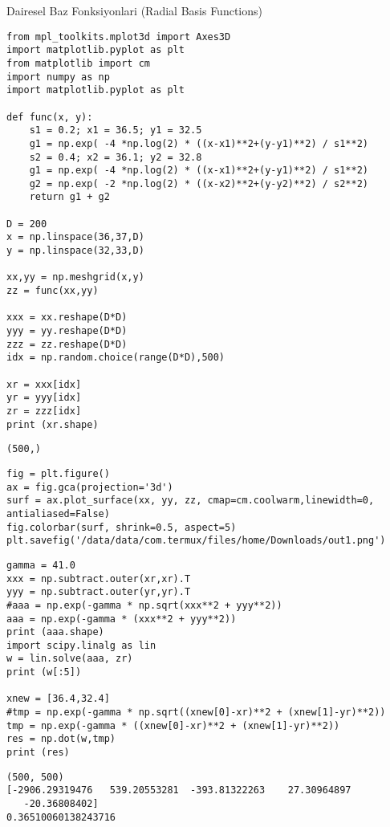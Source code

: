 \documentclass[12pt,fleqn]{article}\usepackage{../../common}
\begin{document}
Dairesel Baz Fonksiyonlari (Radial Basis Functions)

\begin{verbatim}
from mpl_toolkits.mplot3d import Axes3D
import matplotlib.pyplot as plt
from matplotlib import cm
import numpy as np
import matplotlib.pyplot as plt

def func(x, y):
    s1 = 0.2; x1 = 36.5; y1 = 32.5
    g1 = np.exp( -4 *np.log(2) * ((x-x1)**2+(y-y1)**2) / s1**2)
    s2 = 0.4; x2 = 36.1; y2 = 32.8
    g1 = np.exp( -4 *np.log(2) * ((x-x1)**2+(y-y1)**2) / s1**2)
    g2 = np.exp( -2 *np.log(2) * ((x-x2)**2+(y-y2)**2) / s2**2)
    return g1 + g2

D = 200
x = np.linspace(36,37,D)
y = np.linspace(32,33,D)

xx,yy = np.meshgrid(x,y)
zz = func(xx,yy)

xxx = xx.reshape(D*D)
yyy = yy.reshape(D*D)
zzz = zz.reshape(D*D)
idx = np.random.choice(range(D*D),500)

xr = xxx[idx]
yr = yyy[idx]
zr = zzz[idx]
print (xr.shape)
\end{verbatim}

\begin{verbatim}
(500,)
\end{verbatim}

\begin{verbatim}
fig = plt.figure()
ax = fig.gca(projection='3d')
surf = ax.plot_surface(xx, yy, zz, cmap=cm.coolwarm,linewidth=0, antialiased=False)
fig.colorbar(surf, shrink=0.5, aspect=5)
plt.savefig('/data/data/com.termux/files/home/Downloads/out1.png')
\end{verbatim}

\begin{verbatim}
gamma = 41.0
xxx = np.subtract.outer(xr,xr).T
yyy = np.subtract.outer(yr,yr).T
#aaa = np.exp(-gamma * np.sqrt(xxx**2 + yyy**2))
aaa = np.exp(-gamma * (xxx**2 + yyy**2))
print (aaa.shape)
import scipy.linalg as lin
w = lin.solve(aaa, zr)
print (w[:5])

xnew = [36.4,32.4]
#tmp = np.exp(-gamma * np.sqrt((xnew[0]-xr)**2 + (xnew[1]-yr)**2))
tmp = np.exp(-gamma * ((xnew[0]-xr)**2 + (xnew[1]-yr)**2))
res = np.dot(w,tmp)
print (res)
\end{verbatim}

\begin{verbatim}
(500, 500)
[-2906.29319476   539.20553281  -393.81322263    27.30964897
   -20.36808402]
0.36510060138243716
\end{verbatim}
\end{document}
